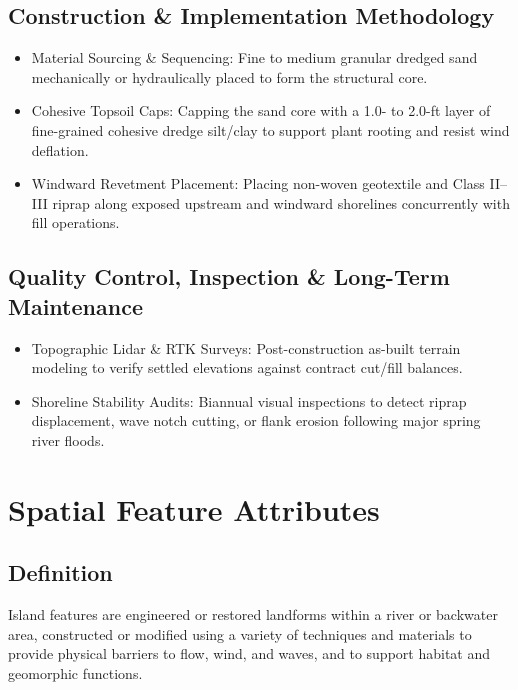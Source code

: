 \documentclass[
  letterpaper,
  DIV=11,
  numbers=noendperiod]{scrreprt}
\begin{document}
\subsection{Construction \& Implementation
Methodology}\label{construction-implementation-methodology-7}

\begin{itemize}
\item
  Material Sourcing \& Sequencing: Fine to medium granular dredged sand
  mechanically or hydraulically placed to form the structural core.
\item
  Cohesive Topsoil Caps: Capping the sand core with a 1.0- to 2.0-ft
  layer of fine-grained cohesive dredge silt/clay to support plant
  rooting and resist wind deflation.
\item
  Windward Revetment Placement: Placing non-woven geotextile and Class
  II--III riprap along exposed upstream and windward shorelines
  concurrently with fill operations.
\end{itemize}

\subsection{Quality Control, Inspection \& Long-Term
Maintenance}\label{quality-control-inspection-long-term-maintenance-7}

\begin{itemize}
\item
  Topographic Lidar \& RTK Surveys: Post-construction as-built terrain
  modeling to verify settled elevations against contract cut/fill
  balances.
\item
  Shoreline Stability Audits: Biannual visual inspections to detect
  riprap displacement, wave notch cutting, or flank erosion following
  major spring river floods.
\end{itemize}

\section{Spatial Feature Attributes}\label{spatial-feature-attributes-1}

\subsection{Definition}\label{definition-7}

Island features are engineered or restored landforms within a river or
backwater area, constructed or modified using a variety of techniques
and materials to provide physical barriers to flow, wind, and waves, and
to support habitat and geomorphic functions.
\end{document}
